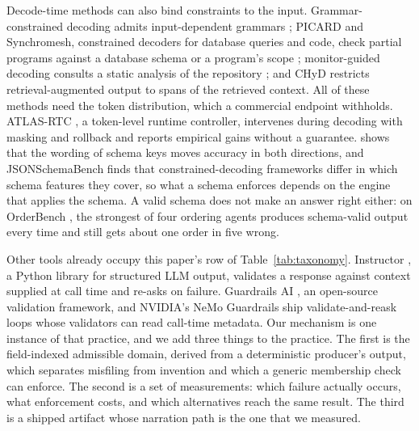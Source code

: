\documentclass[smallextended,natbib]{svjour3}
\begin{document}
Decode-time methods can also bind constraints to the input.
Grammar-constrained decoding admits input-dependent grammars \citep{gcd}; PICARD and Synchromesh, constrained decoders for database queries and code, check partial
programs against a database schema or a program's
scope \citep{scholak2021picard,poesia2022synchromesh}; monitor-guided decoding
consults a static analysis of the repository \citep{agrawal2023mgd}; and
CHyD \citep{signe2026chyd} restricts retrieval-augmented output to spans of the
retrieved context. All of these methods need the token distribution, which a
commercial endpoint withholds. ATLAS-RTC \citep{cruz2026atlasrtc}, a
token-level runtime controller, intervenes during decoding with masking and
rollback and reports empirical gains without a guarantee. \citet{le2026schemakey} shows that the
wording of schema keys moves accuracy in both directions, and
JSONSchemaBench \citep{geng2025jsonschemabench} finds that constrained-decoding
frameworks differ in which schema features they cover, so what a schema
enforces depends on the engine that applies the schema. A valid schema does not
make an answer right either: on OrderBench \citep{li2026orderbench}, the
strongest of four ordering agents produces schema-valid output every time and
still gets about one order in five wrong.

Other tools already occupy this paper's row of Table~\ref{tab:taxonomy}.
Instructor \citep{liu2023instructor}, a Python library for structured LLM
output, validates a response against context supplied at call time and re-asks
on failure. Guardrails AI \citep{guardrailsai}, an open-source validation
framework, and NVIDIA's NeMo Guardrails \citep{nemo} ship validate-and-reask
loops whose validators can read call-time metadata. Our mechanism is one
instance of that practice, and we add three things to the practice. The first
is the field-indexed admissible domain, derived from a deterministic
producer's output, which separates misfiling from invention and which a
generic membership check can enforce. The second is a set of measurements:
which failure actually occurs, what enforcement costs, and which alternatives
reach the same result. The third is a shipped artifact whose narration path is
the one that we measured.
\end{document}
